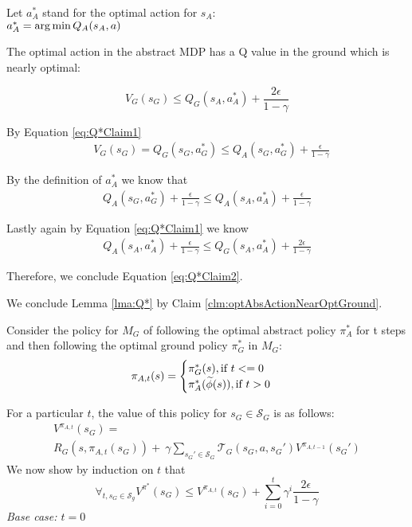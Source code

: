 Let $a^*_A$ stand for the optimal action for $s_A$:\\
 $a^*_A = \operatorname*{arg\,min} Q_A(s_A, a)$

\begin{clm}
\label{clm:optAbsActionNearOptGround}
The optimal action in the abstract MDP has a Q value in the ground which is nearly optimal:
\end{clm}

\begin{equation}
\label{eq:Q*Claim2}
V_G(s_G) \leq Q_G(s_A, a^*_A) + \frac{2\epsilon}{1-\gamma}
\end{equation}

By Equation \ref{eq:Q*Claim1}
\begin{align}
&V_G(s_G) = Q_G(s_G, a^*_G) \leq Q_A(s_G, a^*_G) + \frac{\epsilon}{1-\gamma}
\label{eq:Q*OptActionResult}
\end{align}

 By the definition of $a^*_A$ we know that 
 \begin{align}
Q_A(s_G, a^*_G) + \frac{\epsilon}{1-\gamma} \leq Q_A(s_A, a^*_A) + \frac{\epsilon}{1-\gamma}
\end{align}

Lastly again by Equation \ref{eq:Q*Claim1} we know
\begin{align}
Q_A(s_A, a^*_A) + \frac{\epsilon}{1-\gamma} \leq Q_G(s_A, a^*_A) + \frac{2\epsilon}{1-\gamma}
\end{align}

Therefore, we conclude Equation \ref{eq:Q*Claim2}.

\begin{clm}
We conclude Lemma \ref{lma:Q*} by Claim \ref{clm:optAbsActionNearOptGround}.
\end{clm}

Consider the policy for $M_G$ of following the optimal abstract policy $\pi^*_A$ for t steps and then following the optimal ground policy $\pi^*_G$ in $M_G$:
\begin{equation}
\pi_{A,t}(s)=
\begin{cases}
\pi_G^*(s), \text{if $t<=0$}\\
\pi_A^*(\widetilde \phi(s)), \text{if $t > 0$}
\end{cases}
\end{equation}

For a particular $t$, the value of this policy for $s_G \in \mathcal{S}_G$ is as follows:
\begin{multline*}
V^{\pi_{A,t}}(s_G) = \\
R_G(s, \pi_{A,t}(s_G)) +\ \gamma \sum_{{s_G}' \in \mathcal{S}_G}\mathcal{T}_G(s_G, a, {s_G}')V^{\pi_{A,t-1}}({s_G}')
\end{multline*}
We now show by induction on $t$ that
\begin{equation}
\forall_{t, s_G \in \mathcal{S}_g} V^{\pi^*}(s_G) \leq  V^{\pi_{A,t}}(s_G) + \sum_{i=0}^{t}\gamma^i \frac{2\epsilon}{1-\gamma}
\end{equation}
\textit{Base case: $t=0$}

